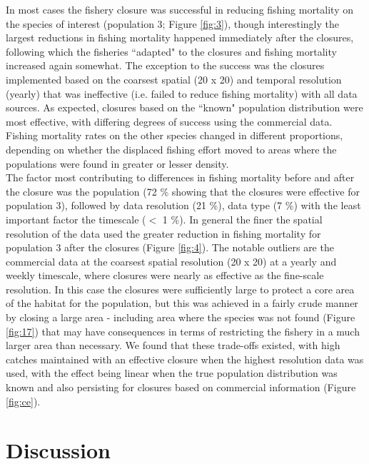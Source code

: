 \documentclass[review]{elsarticle}
\begin{document}
In most cases the fishery closure was successful in reducing fishing mortality
on the species of interest (population 3; Figure \ref{fig:3}), though
interestingly the largest reductions in fishing mortality happened immediately
after the closures, following which the fisheries ``adapted" to the closures
and fishing mortality increased again somewhat. The exception to the success
was the closures implemented based on the coarsest spatial (20 x 20) and
temporal resolution (yearly) that was ineffective (i.e. failed to reduce
fishing mortality) with all data sources. As expected, closures based on the
``known" population distribution were most effective, with differing degrees of
success using the commercial data. Fishing mortality rates on the other species
changed in different proportions, depending on whether the displaced fishing
effort moved to areas where the populations were found in greater or lesser
density. \\

The factor most contributing to differences in fishing mortality before and
after the closure was the population (72 \% showing that the closures were
effective for population 3), followed by data resolution (21 \%), data type (7
\%) with the least important factor the timescale ($<$ 1 \%). In general the
finer the spatial resolution of the data used the greater reduction in fishing
mortality for population 3 after the closures (Figure \ref{fig:4}). The notable
outliers are the commercial data at the coarsest spatial resolution (20 x 20)
at a yearly and weekly timescale, where closures were nearly as effective as
the fine-scale resolution. In this case the closures were sufficiently large to
protect a core area of the habitat for the population, but this was achieved in
a fairly crude manner by closing a large area - including area where the
species was not found (Figure \ref{fig:17}) that may have consequences in terms
of restricting the fishery in a much larger area than necessary. We found that
these trade-offs existed, with high catches maintained with an effective
closure when the highest resolution data was used, with the effect being linear
when the true population distribution was known and also persisting for
closures based on commercial information (Figure \ref{fig:ce}).\\

\section{Discussion}
\end{document}

